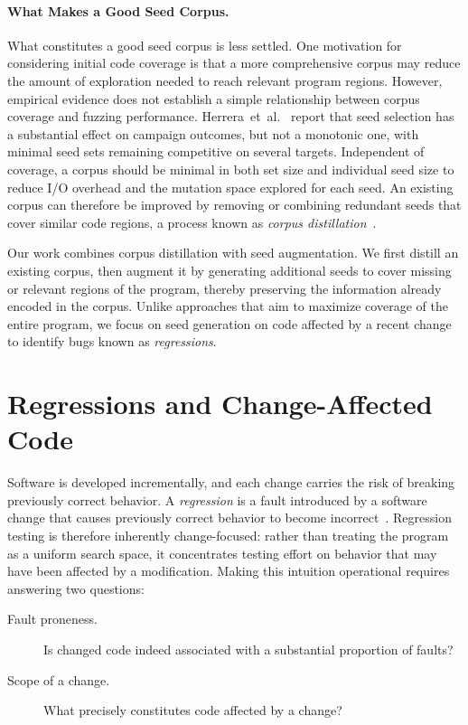 \paragraph{What Makes a Good Seed Corpus.}
What constitutes a good seed corpus is less settled. One motivation for
considering initial code coverage is that a more comprehensive corpus may reduce
the amount of exploration needed to reach relevant program regions. However,
empirical evidence does not establish a simple relationship between corpus
coverage and fuzzing performance. Herrera~et~al.~\cite{herreraSeedSelectionSuccessful2021}
report that seed selection has a substantial effect on campaign outcomes, but
not a monotonic one, with minimal seed sets remaining competitive on several
targets. Independent of coverage, a corpus should be minimal in both set size
and individual seed size to reduce I/O overhead and the mutation space explored
for each seed. An existing corpus can therefore be improved by removing or
combining redundant seeds that cover similar code regions, a process known as
\emph{corpus distillation}~\cite{rebertOptimizingSeedSelection}.

\bigskip
Our work combines corpus distillation with seed augmentation. We first distill
an existing corpus, then augment it by generating additional seeds to cover
missing or relevant regions of the program, thereby preserving the information
already encoded in the corpus. Unlike approaches that aim to maximize coverage
of the entire program, we focus on seed generation on code affected by a recent
change to identify bugs known as \emph{regressions}.

\section{Regressions and Change-Affected Code}
\label{sec:regressions}

Software is developed incrementally, and each change carries the risk of
breaking previously correct behavior. A \emph{regression} is a fault introduced
by a software change that causes previously correct behavior to become
incorrect~\cite{avizienisBasicConceptsTaxonomy2004}. Regression testing is
therefore inherently change-focused: rather than treating the program as a
uniform search space, it concentrates testing effort on behavior that may have
been affected by a modification. Making this intuition operational requires
answering two questions:

\begin{description}
  \item[Fault proneness.] Is changed code indeed associated with a substantial
    proportion of faults?
  \item[Scope of a change.] What precisely constitutes code affected by a
    change?
\end{description}

